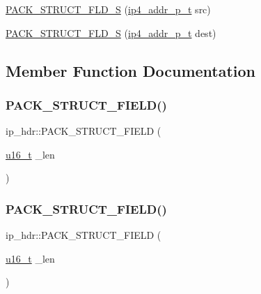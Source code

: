 \begin{DoxyCompactItemize}
\item 
\hyperlink{structip__hdr_a963b0932198484088775c5aa7446f0c1}{P\+A\+C\+K\+\_\+\+S\+T\+R\+U\+C\+T\+\_\+\+F\+L\+D\+\_\+S} (\hyperlink{native_2lwip_2src_2include_2lwip_2prot_2ip4_8h_ae5011654fcbadf6b6582b8d49446107f}{ip4\+\_\+addr\+\_\+p\+\_\+t} src)
\item 
\hyperlink{structip__hdr_ab8c3ee74d121d94a735076773af41b9a}{P\+A\+C\+K\+\_\+\+S\+T\+R\+U\+C\+T\+\_\+\+F\+L\+D\+\_\+S} (\hyperlink{native_2lwip_2src_2include_2lwip_2prot_2ip4_8h_ae5011654fcbadf6b6582b8d49446107f}{ip4\+\_\+addr\+\_\+p\+\_\+t} dest)
\end{DoxyCompactItemize}


\subsection{Member Function Documentation}
\mbox{\label{structip__hdr_aa3905f2613b3ce0994d3a04cf22ce2d7}} 
\subsubsection{\texorpdfstring{P\+A\+C\+K\+\_\+\+S\+T\+R\+U\+C\+T\+\_\+\+F\+I\+E\+L\+D()}{PACK\_STRUCT\_FIELD()}\hspace{0.1cm}{\footnotesize\ttfamily [1/8]}}
{\footnotesize\ttfamily ip\+\_\+hdr\+::\+P\+A\+C\+K\+\_\+\+S\+T\+R\+U\+C\+T\+\_\+\+F\+I\+E\+LD (\begin{DoxyParamCaption}\item[{\hyperlink{group__compiler__abstraction_ga77570ac4fcab86864fa1916e55676da2}{u16\+\_\+t}}]{\+\_\+len }\end{DoxyParamCaption})}

\mbox{\label{structip__hdr_aa3905f2613b3ce0994d3a04cf22ce2d7}} 
\subsubsection{\texorpdfstring{P\+A\+C\+K\+\_\+\+S\+T\+R\+U\+C\+T\+\_\+\+F\+I\+E\+L\+D()}{PACK\_STRUCT\_FIELD()}\hspace{0.1cm}{\footnotesize\ttfamily [2/8]}}
{\footnotesize\ttfamily ip\+\_\+hdr\+::\+P\+A\+C\+K\+\_\+\+S\+T\+R\+U\+C\+T\+\_\+\+F\+I\+E\+LD (\begin{DoxyParamCaption}\item[{\hyperlink{group__compiler__abstraction_ga77570ac4fcab86864fa1916e55676da2}{u16\+\_\+t}}]{\+\_\+len }\end{DoxyParamCaption})}

